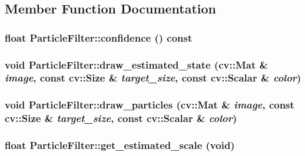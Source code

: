 \subsection{Member Function Documentation}
\hypertarget{classParticleFilter_aba8448793be2944625d91b2ca1a2af17}{
\subsubsection[{confidence}]{\setlength{\rightskip}{0pt plus 5cm}float ParticleFilter::confidence () const}}
\label{classParticleFilter_aba8448793be2944625d91b2ca1a2af17}
\hypertarget{classParticleFilter_a93b28af3da883f2b1a8d662fe72ddb2b}{
\subsubsection[{draw\_\-estimated\_\-state}]{\setlength{\rightskip}{0pt plus 5cm}void ParticleFilter::draw\_\-estimated\_\-state (cv::Mat \& {\em image}, \/  const cv::Size \& {\em target\_\-size}, \/  const cv::Scalar \& {\em color})}}
\label{classParticleFilter_a93b28af3da883f2b1a8d662fe72ddb2b}
\hypertarget{classParticleFilter_aff7ddfc78e3b1e46e344603cfc4b0632}{
\subsubsection[{draw\_\-particles}]{\setlength{\rightskip}{0pt plus 5cm}void ParticleFilter::draw\_\-particles (cv::Mat \& {\em image}, \/  const cv::Size \& {\em target\_\-size}, \/  const cv::Scalar \& {\em color})}}
\label{classParticleFilter_aff7ddfc78e3b1e46e344603cfc4b0632}
\hypertarget{classParticleFilter_a7d3863cfb7922787bdfae897bf24a734}{
\subsubsection[{get\_\-estimated\_\-scale}]{\setlength{\rightskip}{0pt plus 5cm}float ParticleFilter::get\_\-estimated\_\-scale (void)}}
